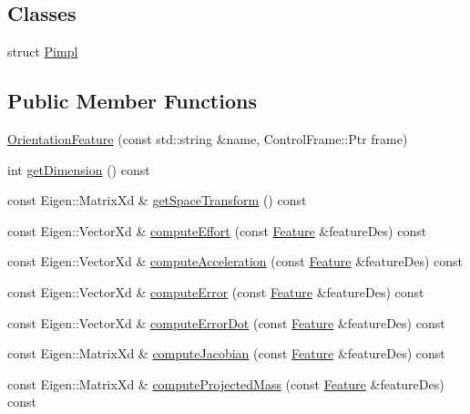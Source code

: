 \subsection*{Classes}
\begin{DoxyCompactItemize}
\item 
struct \hyperlink{structocra_1_1OrientationFeature_1_1Pimpl}{Pimpl}
\end{DoxyCompactItemize}
\subsection*{Public Member Functions}
\begin{DoxyCompactItemize}
\item 
\hyperlink{classocra_1_1OrientationFeature_acea2f5647dd31094ff4e83a77a89fdd8}{Orientation\+Feature} (const std\+::string \&name, Control\+Frame\+::\+Ptr frame)
\item 
int \hyperlink{classocra_1_1OrientationFeature_a20e61cf1de83429db026d162fc5d459e}{get\+Dimension} () const
\item 
const Eigen\+::\+Matrix\+Xd \& \hyperlink{classocra_1_1OrientationFeature_ae820bfe2017c670eac6717fda7408c67}{get\+Space\+Transform} () const
\item 
const Eigen\+::\+Vector\+Xd \& \hyperlink{classocra_1_1OrientationFeature_a3aef6b9e83419882a81792804d8da00e}{compute\+Effort} (const \hyperlink{classocra_1_1Feature}{Feature} \&feature\+Des) const
\item 
const Eigen\+::\+Vector\+Xd \& \hyperlink{classocra_1_1OrientationFeature_af5ccb1a3d72b23bc0498c357303fe0e2}{compute\+Acceleration} (const \hyperlink{classocra_1_1Feature}{Feature} \&feature\+Des) const
\item 
const Eigen\+::\+Vector\+Xd \& \hyperlink{classocra_1_1OrientationFeature_a013b77e19c995ce9eaf8b76463b8edc7}{compute\+Error} (const \hyperlink{classocra_1_1Feature}{Feature} \&feature\+Des) const
\item 
const Eigen\+::\+Vector\+Xd \& \hyperlink{classocra_1_1OrientationFeature_a49fd73d3b8dd5eb2f26c32c3c4440644}{compute\+Error\+Dot} (const \hyperlink{classocra_1_1Feature}{Feature} \&feature\+Des) const
\item 
const Eigen\+::\+Matrix\+Xd \& \hyperlink{classocra_1_1OrientationFeature_a14327a30bae8c06ea241aeeb19a48631}{compute\+Jacobian} (const \hyperlink{classocra_1_1Feature}{Feature} \&feature\+Des) const
\item 
const Eigen\+::\+Matrix\+Xd \& \hyperlink{classocra_1_1OrientationFeature_ae30a255a7e0edf9704c0c8e2dbd5447f}{compute\+Projected\+Mass} (const \hyperlink{classocra_1_1Feature}{Feature} \&feature\+Des) const

\end{DoxyCompactItemize}
